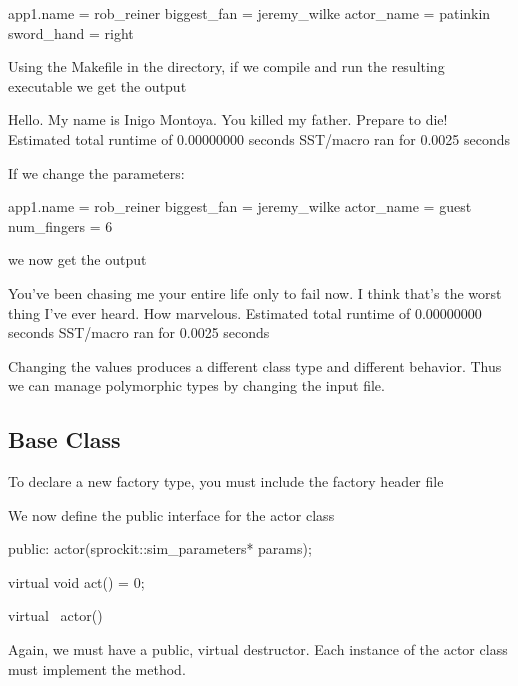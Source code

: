 \begin{ViFile}
app1.name = rob_reiner
biggest_fan = jeremy_wilke
actor_name = patinkin
sword_hand = right
\end{ViFile}

Using the Makefile in the directory, if we compile and run the resulting executable we get the output

\begin{ViFile}
Hello. My name is Inigo Montoya. You killed my father. Prepare to die!
Estimated total runtime of           0.00000000 seconds
SST/macro ran for       0.0025 seconds
\end{ViFile}

If we change the parameters:

\begin{ViFile}
app1.name = rob_reiner
biggest_fan = jeremy_wilke
actor_name = guest
num_fingers = 6
\end{ViFile}

we now get the output

\begin{ViFile}
You've been chasing me your entire life only to fail now.
I think that's the worst thing I've ever heard. How marvelous.
Estimated total runtime of           0.00000000 seconds
SST/macro ran for       0.0025 seconds
\end{ViFile}

Changing the values produces a different class type and different behavior.
Thus we can manage polymorphic types by changing the input file.

\subsection{Base Class}\label{subsec:baseClass}
To declare a new factory type, you must include the factory header file

\begin{CppCode}
#include <sprockit/factories/factory.h>

namespace sstmac {
    namespace tutorial {

class actor
{
\end{CppCode}


We now define the public interface for the actor class

\begin{CppCode}
 public:
  actor(sprockit::sim_parameters* params);
  
  virtual void act() = 0;

  virtual ~actor(){}
\end{CppCode}
Again, we must have a public, virtual destructor.
Each instance of the actor class must implement the  method.

